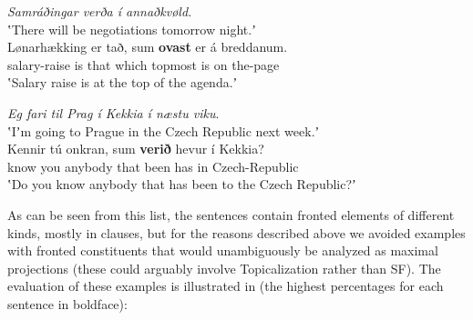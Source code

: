 \documentclass[output=paper]{LSP/langsci}
\begin{document}
	\ex \textit{Samráðingar verða í annaðkvøld.}\\
	\glt	ʽThere will be negotiations tomorrow night.ʼ\\
	\gll	Lønarhækking  er   tað,   sum     \textbf{ovast}     er   á   breddanum.\\
			salary-raise    is  that  which   topmost   is   on the-page  \\
	\glt 	ʽSalary raise is at the top of the agenda.ʼ

	\ex \textit{Eg fari til Prag í Kekkia í næstu viku}.\\
	\glt	ʽIʼm going to Prague in the Czech Republic next week.ʼ\\
	\gll	Kennir   tú     onkran,   sum   \textbf{verið}  hevur   í   Kekkia?\\
			know    you  anybody   that   been   has   in  Czech-Republic  \\
	\glt	ʽDo you know anybody that has been to the Czech Republic?ʼ
	\z
\z

As can be seen from this list, the sentences contain fronted elements of different kinds, mostly in  clauses, but for the reasons described above we avoided examples with fronted constituents that would unambiguously be analyzed as maximal projections (these could arguably involve Topicalization rather than SF). The evaluation of these examples is illustrated in  (the highest percentages for each sentence in boldface):
\end{document}
